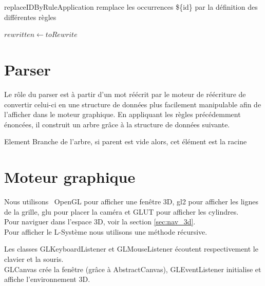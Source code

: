 \begin{algorithm}
\DontPrintSemicolon
\KwIn{toRewrite: $String$, rules : $List[Tuple[String, String]$}
\caption{replaceIDByRuleApplication remplace les occurrences \$\{id\} par la définition des différentes règles}
$rewritten \gets toRewrite$\;
\end{algorithm}

\clearpage

\section{Parser}
\label{sec:parser}

Le rôle du parser est à partir d'un mot réécrit par le moteur de réécriture de convertir celui-ci en une structure de données plus facilement manipulable afin de l'afficher dans le moteur graphique.
En appliquant les règles précédemment énoncées, il construit un arbre grâce à la structure de données suivante.

\begin{algorithm}
\DontPrintSemicolon
\caption{Element Branche de l'arbre, si parent est vide alors, cet élément est la racine}
\end{algorithm}


\section{Moteur graphique}
\label{sec:interface3d}

Nous utilisons \Java \ OpenGL pour afficher une fenêtre 3D, gl2 pour afficher les lignes de la grille, glu pour placer la caméra et GLUT pour afficher les cylindres.\\
Pour naviguer dans l'espace 3D, voir la section \ref{sec:nav_3d}.\\
Pour afficher le L-Système nous utilisons une méthode récursive.

Les classes GLKeyboardListener et GLMouseListener écoutent respectivement le clavier et la souris.\\

GLCanvas crée la fenêtre (grâce à AbstractCanvas), GLEventListener initialise et affiche l'environnement 3D.\\

